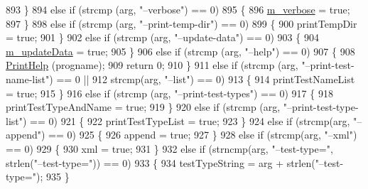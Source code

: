 \begin{DoxyCode}
893         \}
894       \textcolor{keywordflow}{else} \textcolor{keywordflow}{if} (strcmp (arg, \textcolor{stringliteral}{"--verbose"}) == 0)
895         \{
896           \hyperlink{classns3_1_1TestRunnerImpl_ad9188e308ca5a1822ca9c49dd5f9b510}{m\_verbose} = \textcolor{keyword}{true};
897         \}
898       \textcolor{keywordflow}{else} \textcolor{keywordflow}{if} (strcmp (arg, \textcolor{stringliteral}{"--print-temp-dir"}) == 0)
899         \{
900           printTempDir = \textcolor{keyword}{true};
901         \}
902       \textcolor{keywordflow}{else} \textcolor{keywordflow}{if} (strcmp (arg, \textcolor{stringliteral}{"--update-data"}) == 0)
903         \{
904           \hyperlink{classns3_1_1TestRunnerImpl_a5751d5379b5bde6b54cfb68151ddf8b3}{m\_updateData} = \textcolor{keyword}{true};
905         \}
906       \textcolor{keywordflow}{else} \textcolor{keywordflow}{if} (strcmp (arg, \textcolor{stringliteral}{"--help"}) == 0)
907         \{
908           \hyperlink{classns3_1_1TestRunnerImpl_a6ebd6ac3d170ea7969f428ed305a49d1}{PrintHelp} (progname);
909           \textcolor{keywordflow}{return} 0;
910         \}
911       \textcolor{keywordflow}{else} \textcolor{keywordflow}{if} (strcmp (arg, \textcolor{stringliteral}{"--print-test-name-list"}) == 0 ||
912                strcmp(arg, \textcolor{stringliteral}{"--list"}) == 0)
913         \{
914           printTestNameList = \textcolor{keyword}{true};
915         \}
916       \textcolor{keywordflow}{else} \textcolor{keywordflow}{if} (strcmp (arg, \textcolor{stringliteral}{"--print-test-types"}) == 0)
917         \{
918           printTestTypeAndName = \textcolor{keyword}{true};
919         \}
920       \textcolor{keywordflow}{else} \textcolor{keywordflow}{if} (strcmp (arg, \textcolor{stringliteral}{"--print-test-type-list"}) == 0)
921         \{
922           printTestTypeList = \textcolor{keyword}{true};
923         \}
924      \textcolor{keywordflow}{else} \textcolor{keywordflow}{if} (strcmp(arg, \textcolor{stringliteral}{"--append"}) == 0)
925         \{
926           append = \textcolor{keyword}{true};
927         \}
928       \textcolor{keywordflow}{else} \textcolor{keywordflow}{if} (strcmp(arg, \textcolor{stringliteral}{"--xml"}) == 0)
929         \{
930           xml = \textcolor{keyword}{true};
931         \}
932       \textcolor{keywordflow}{else} \textcolor{keywordflow}{if} (strncmp(arg, \textcolor{stringliteral}{"--test-type="}, strlen(\textcolor{stringliteral}{"--test-type="})) == 0)
933         \{
934           testTypeString = arg + strlen(\textcolor{stringliteral}{"--test-type="});
935         \}

\end{DoxyCode}

